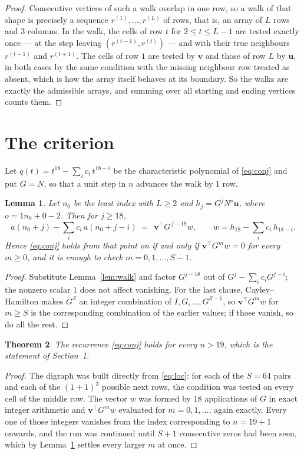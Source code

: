 \documentclass[11pt,a4paper]{article}
\theoremstyle{plain}
\newtheorem{theorem}{Theorem}
\newtheorem{lemma}[theorem]{Lemma}
\theoremstyle{definition}
\begin{document}
\begin{proof}
Consecutive vertices of such a walk overlap in one row, so a walk of that shape is
precisely a sequence $r^{(1)},\dots,r^{(L)}$ of rows, that is, an array of $L$ rows
and $3$ columns. In the walk, the cells of row $t$ for $2\le t\le L-1$ are tested
exactly once --- at the step leaving $(r^{(t-1)},r^{(t)})$ --- and with their true
neighbours $r^{(t-1)}$ and $r^{(t+1)}$. The cells of row $1$ are tested by
$\mathbf{v}$ and those of row $L$ by $\mathbf{u}$, in both cases by the same condition
with the missing neighbour row treated as absent, which is how the array itself behaves at
its boundary. So the walks are exactly the admissible arrays, and summing over all starting
and ending vertices counts them.
\end{proof}

\section{The criterion}

Let $q(t)=t^{18}-\sum_i c_i\,t^{18-i}$ be the characteristic polynomial of
\eqref{eq:conj} and put $G=N$, so that a unit step in $n$ advances the walk by
$1$ row.

\begin{lemma}\label{lem:crit}
Let $n_0$ be the least index with $L\ge2$ and $h_j=G^{j}N^{o}\mathbf{u}$, where
$o=1n_0+0-2$. Then for $j\ge18$,
\[
a(n_0+j)-\sum_i c_i\,a(n_0+j-i)\;=\;\,\mathbf{v}^{\!\top}G^{\,j-18}w,
\qquad w=h_{18}-\sum_i c_i\,h_{18-i} .
\]
Hence \eqref{eq:conj} holds from that point on if and only if
$\mathbf{v}^{\!\top}G^{m}w=0$ for every $m\ge0$, and it is enough to check
$m=0,1,\dots,S-1$.
\end{lemma}

\begin{proof}
Substitute Lemma~\ref{lem:walk} and factor $G^{j-18}$ out of
$G^{j}-\sum_ic_iG^{j-i}$; the nonzero scalar $1$ does not affect
vanishing. For the last clause, Cayley--Hamilton makes $G^{S}$ an integer combination of
$I,G,\dots,G^{S-1}$, so $\mathbf{v}^{\!\top}G^{m}w$ for $m\ge S$ is the corresponding
combination of the earlier values; if those vanish, so do all the rest.
\end{proof}

\begin{theorem}
The recurrence \eqref{eq:conj} holds for every $n>19$, which is the statement of
Section~1.
\end{theorem}

\begin{proof}
The digraph was built directly from \eqref{eq:loc}: for each of the $S=64$ pairs and each
of the $(1+1)^{3}$ possible next rows, the condition was tested on every cell of
the middle row. The vector $w$ was formed by $18$ applications of $G$ in exact integer
arithmetic and $\mathbf{v}^{\!\top}G^{m}w$ evaluated for $m=0,1,\dots$, again exactly.
Every one of those integers vanishes from the index corresponding to $n=19+1$ onwards,
and the run was continued until $S+1$ consecutive zeros had been seen, which by
Lemma~\ref{lem:crit} settles every larger $m$ at once.
\end{proof}
\end{document}
